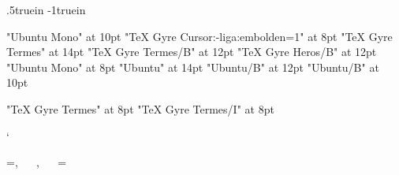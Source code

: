 




\resetatcatcode








\def\TZPhsize{40em}
\let\TZPtexlayout=1
\def\TZPimageformat{png}

\advance\hoffset .5truein
\advance\hsize -1truein


\ifx\suppressfontnotfounderror\UnDeFiNeD\else
\fi

\let\oldtentt\tentt
\font\tentt "Ubuntu Mono" at 10pt
\ifx\tentt\nullfont
\let\tentt\oldtentt
\font\eighttt "TeX Gyre Cursor:-liga:embolden=1" at 8pt
\font\fourteenrm "TeX Gyre Termes" at 14pt
\font\twelvebf "TeX Gyre Termes/B" at 12pt
\font\tensansbf "TeX Gyre Heros/B" at 12pt
\else
\font\eighttt "Ubuntu Mono" at 8pt
\font\fourteenrm "Ubuntu" at 14pt
\font\twelvebf "Ubuntu/B" at 12pt
\font\tensansbf "Ubuntu/B" at 10pt
\fi

\font\eightrm "TeX Gyre Termes" at 8pt
\font\eightit "TeX Gyre Termes/I" at 8pt

\def\titlefont{\fourteenrm \baselineskip=16.8pt \relax}
\def\chapterfont{\twelvebf \baselineskip=14.4pt \relax}
\def\sectionfont{\tensansbf}
\def\eightfont{\eightrm\let\it\eightit\let\tt\eighttt\baselineskip 9.6pt \relax}

\def\footnotehook{\eightfont}

\def\tthook{\catcode`\|=0 \def\|{\char`\|}\def\ {·}}

\activettchar`

\ifx\shipout\UnDeFiNeD\else
\def\XeTeX{Xe\TeX}
\def\ConTeXt{Con\TeX t}
\fi



\def\beginmulticols#1{}
\def\endmulticols{}

\ifx\shipout\UnDeFiNeD\else
{}
\fi

\ifx\shipout\UnDeFiNeD
\headline={\folio, ~~ , ~~ }
\footline={\the\headline}
\fi

\def\meta[#1]{\leavevmode\hbox{\em #1}}

